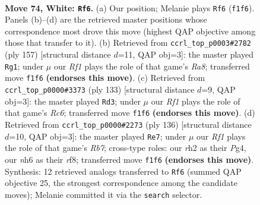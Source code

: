 \documentclass[11pt]{article}
\begin{document}
\clearpage

\begin{figure}[p]\centering
\begin{subfigure}{0.46\textwidth}\centering
\resizebox{\linewidth}{!}{%
\newchessgame
\chessboard[
  setfen={6k1/8/1P5n/P7/8/1K6/7r/5R2 w - - 11 74},
  showmover=false,
  pgfstyle=straightmove, color=movearrow, markmove={f1-f6}
]}
\caption{}
\end{subfigure}\hfill
\begin{subfigure}{0.46\textwidth}\centering
\resizebox{\linewidth}{!}{%
\newchessgame
\chessboard[
  setfen={1R6/4k3/8/7K/8/p5N1/8/r7 b - - 8 79},
  showmover=false,
  pgfstyle=straightmove, color=movearrow, markmove={a1-g1}
]}
\caption{}
\end{subfigure}
\\[4pt]
\begin{subfigure}{0.46\textwidth}\centering
\resizebox{\linewidth}{!}{%
\newchessgame
\chessboard[
  setfen={7k/R7/7p/5K2/3N4/2r5/8/8 b - - 16 67},
  showmover=false,
  pgfstyle=straightmove, color=movearrow, markmove={c3-d3}
]}
\caption{}
\end{subfigure}\hfill
\begin{subfigure}{0.46\textwidth}\centering
\resizebox{\linewidth}{!}{%
\newchessgame
\chessboard[
  setfen={5r1k/1R6/7p/4K2P/6P1/8/8/8 w - - 27 69},
  showmover=false,
  pgfstyle=straightmove, color=movearrow, markmove={b7-e7}
]}
\caption{}
\end{subfigure}
\caption{\textbf{Move 74, White: \texttt{Rf6}.} (a) Our position; Melanie plays \texttt{Rf6} (\texttt{f1f6}). Panels (b)--(d) are the retrieved master positions whose correspondence most drove this move (highest QAP objective among those that transfer to it). (b) Retrieved from \texttt{ccrl\_top\_p0003\#2782} (ply 157) [structural distance $d$=11, QAP obj=3]: the master played \texttt{Rg1}; under $\mu$ our \emph{Rf1} plays the role of that game's \emph{Ra8}; transferred move \texttt{f1f6} \textbf{(endorses this move)}. (c) Retrieved from \texttt{ccrl\_top\_p0000\#3373} (ply 133) [structural distance $d$=9, QAP obj=3]: the master played \texttt{Rd3}; under $\mu$ our \emph{Rf1} plays the role of that game's \emph{Rc6}; transferred move \texttt{f1f6} \textbf{(endorses this move)}. (d) Retrieved from \texttt{ccrl\_top\_p0000\#2273} (ply 136) [structural distance $d$=10, QAP obj=3]: the master played \texttt{Re7}; under $\mu$ our \emph{Rf1} plays the role of that game's \emph{Rb7}; cross-type roles: our \emph{r}h2 as their \emph{P}g4, our \emph{n}h6 as their \emph{r}f8; transferred move \texttt{f1f6} \textbf{(endorses this move)}. Synthesis: 12 retrieved analogs transferred to \texttt{Rf6} (summed QAP objective 25, the strongest correspondence among the candidate moves); Melanie committed it via the \texttt{search} selector.}
\label{fig:thought-m146}
\end{figure}
\end{document}
